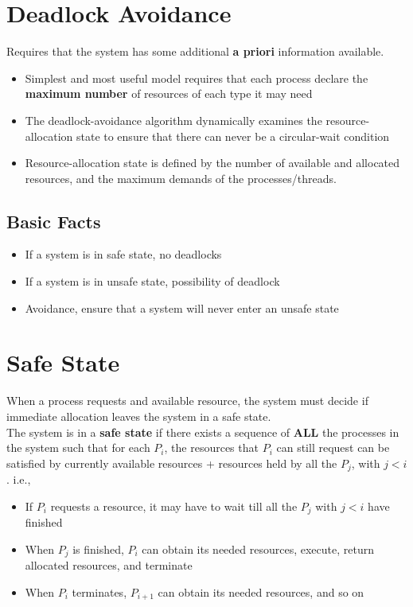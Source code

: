 \documentclass{book/custombook}
\begin{document}
        \section{Deadlock Avoidance}
            Requires that the system has some additional \textbf{a priori} information available.\\
            \begin{itemize}
                \item Simplest and most useful model requires that each process declare the \textbf{maximum number} of resources
                of each type it may need
                \item The deadlock-avoidance algorithm dynamically examines the resource-allocation state to ensure that there can
                never be a circular-wait condition
                \item Resource-allocation state is defined by the number of available and allocated resources, and the maximum demands
                of the processes/threads.
            \end{itemize}
            \subsection{Basic Facts}
                \begin{itemize}
                    \item If a system is in safe state, no deadlocks
                    \item If a system is in unsafe state, possibility of deadlock
                    \item Avoidance, ensure that a system will never enter an unsafe state
                \end{itemize}
        \section{Safe State}
            When a process requests and available resource, the system must decide if immediate allocation leaves the system in 
            a safe state.\\
            The system is in a \textbf{safe state} if there exists a sequence of \textbf{ALL} the processes in the system such that
            for each $P_i$, the resources that $P_i$ can still request can be satisfied by currently available resources + resources 
            held by all the $P_j$, with $j < i$. i.e.,
            \begin{itemize}
                \item If $P_i$ requests a resource, it may have to wait till all the $P_j$ with $j < i$ have finished
                \item When $P_j$ is finished, $P_i$ can obtain its needed resources, execute, return allocated resources, and terminate
                \item When $P_i$ terminates, $P_{i+1}$ can obtain its needed resources, and so on
            \end{itemize}
\end{document}
